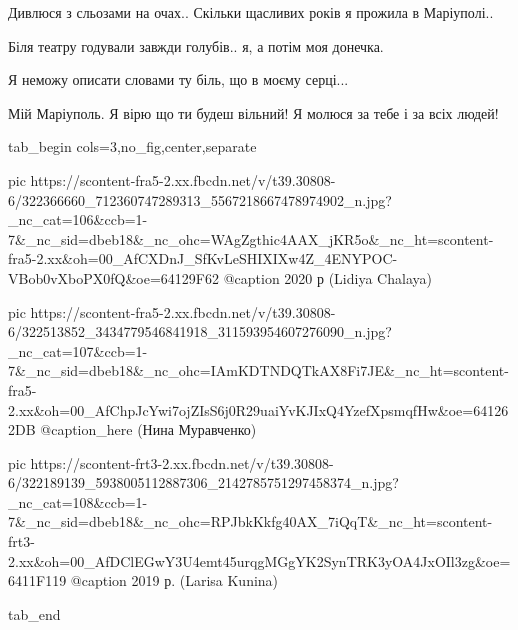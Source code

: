 
Дивлюся з сльозами на очах.. Скільки щасливих років я прожила в Маріуполі..

Біля театру годували завжди голубів.. я, а потім моя донечка.

Я неможу описати словами ту біль, що в моєму серці...

Мій Маріуполь. Я вірю що ти будеш вільний! Я молюся за тебе і за всіх людей!

\begin{center}
\begin{minipage}{\textwidth}

\ifcmt
  tab_begin cols=3,no_fig,center,separate

     pic https://scontent-fra5-2.xx.fbcdn.net/v/t39.30808-6/322366660_712360747289313_5567218667478974902_n.jpg?_nc_cat=106&ccb=1-7&_nc_sid=dbeb18&_nc_ohc=WAgZgthic4AAX_jKR5o&_nc_ht=scontent-fra5-2.xx&oh=00_AfCXDnJ_SfKvLeSHIXIXw4Z_4ENYPOC-VBob0vXboPX0fQ&oe=64129F62
     @caption 2020 р (Lidiya Chalaya)

     pic https://scontent-fra5-2.xx.fbcdn.net/v/t39.30808-6/322513852_3434779546841918_311593954607276090_n.jpg?_nc_cat=107&ccb=1-7&_nc_sid=dbeb18&_nc_ohc=IAmKDTNDQTkAX8Fi7JE&_nc_ht=scontent-fra5-2.xx&oh=00_AfChpJcYwi7ojZIsS6j0R29uaiYvKJIxQ4YzefXpsmqfHw&oe=641262DB
     @caption_here (Нина Муравченко)

     pic https://scontent-frt3-2.xx.fbcdn.net/v/t39.30808-6/322189139_5938005112887306_2142785751297458374_n.jpg?_nc_cat=108&ccb=1-7&_nc_sid=dbeb18&_nc_ohc=RPJbkKkfg40AX_7iQqT&_nc_ht=scontent-frt3-2.xx&oh=00_AfDClEGwY3U4emt45urqgMGgYK2SynTRK3yOA4JxOIl3zg&oe=6411F119
     @caption 2019 р. (Larisa Kunina)

  tab_end
\fi

\end{minipage}
\end{center}
